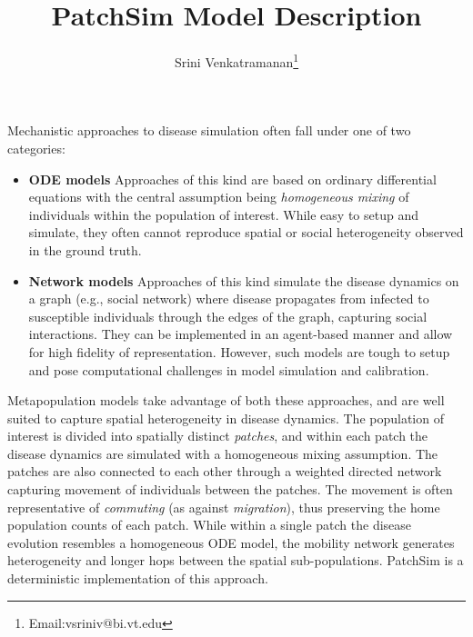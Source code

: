 \documentclass[10pt]{scrartcl}
\title{PatchSim Model Description}
\author{Srini Venkatramanan\footnote{Email:vsriniv@bi.vt.edu}}
\theoremstyle{definition}
\begin{document}
\maketitle

Mechanistic approaches to disease simulation often fall under one of two 
categories: 
\begin{itemize}
	\item \textbf{ODE models} Approaches of this kind are based on ordinary 
	differential equations with the central assumption being \emph{homogeneous 
	mixing} of individuals within the population of interest. While easy to 
	setup and simulate, they often cannot reproduce spatial or social 
	heterogeneity observed in the ground truth.
	
	\item \textbf{Network models} Approaches of this kind simulate the disease 
	dynamics on a graph (e.g., social network)
	where disease propagates from infected to susceptible individuals through 
	the edges of the graph, capturing social interactions. They can be 
	implemented in an agent-based manner and allow for high fidelity of 
	representation. However, such models are tough to setup and pose 
	computational challenges in model simulation and calibration. 
\end{itemize}

Metapopulation models take advantage of both these approaches, and are well 
suited to capture spatial heterogeneity in disease dynamics. The population of 
interest is divided into spatially distinct \emph{patches}, and within each 
patch the disease dynamics are simulated with a homogeneous mixing assumption. 
The patches are also connected to each other through a weighted directed 
network capturing movement of individuals between the patches. The movement is 
often representative of \emph{commuting} (as against \emph{migration}), thus 
preserving the home population counts of each patch. While within a single 
patch the disease evolution resembles a homogeneous ODE model, the mobility 
network generates heterogeneity and longer hops between the spatial 
sub-populations. PatchSim is a deterministic implementation of this approach. 
\end{document}
